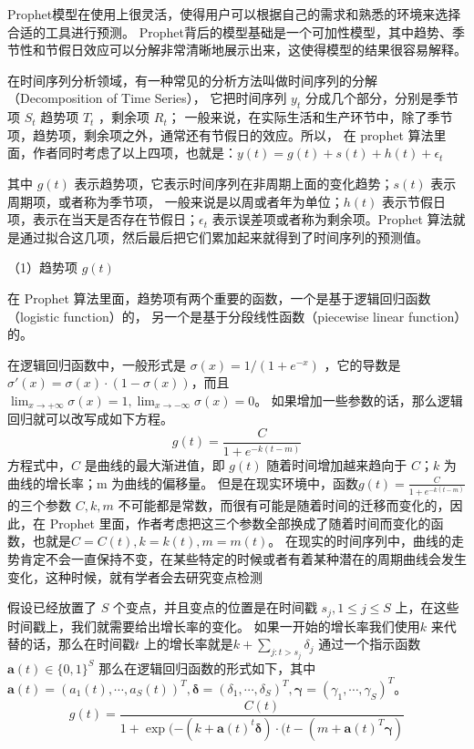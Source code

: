 Prophet模型在使用上很灵活，使得用户可以根据自己的需求和熟悉的环境来选择合适的工具进行预测。
Prophet背后的模型基础是一个可加性模型，其中趋势、季节性和节假日效应可以分解非常清晰地展示出来，这使得模型的结果很容易解释。

在时间序列分析领域，有一种常见的分析方法叫做时间序列的分解（Decomposition of Time Series），
它把时间序列 $y_t$ 分成几个部分，分别是季节项 $S_t$ 趋势项 $T_{t}$ ，剩余项 $R_{t}$；
一般来说，在实际生活和生产环节中，除了季节项，趋势项，剩余项之外，通常还有节假日的效应。所以，
在 prophet 算法里面，作者同时考虑了以上四项，也就是：$y(t) = g(t) + s(t) + h(t) + \epsilon_{t}$ 

其中 $g(t)$ 表示趋势项，它表示时间序列在非周期上面的变化趋势；$s(t)$ 表示周期项，或者称为季节项，
一般来说是以周或者年为单位；$h(t)$ 表示节假日项，表示在当天是否存在节假日；$\epsilon_{t}$ 表示误差项或者称为剩余项。Prophet 算法就是通过拟合这几项，然后最后把它们累加起来就得到了时间序列的预测值。

（1）趋势项 $g(t)$

在 Prophet 算法里面，趋势项有两个重要的函数，一个是基于逻辑回归函数（logistic function）的，
另一个是基于分段线性函数（piecewise linear function）的。

在逻辑回归函数中，一般形式是 $\sigma(x) = 1/(1+e^{-x})$ ，它的导数是 $\sigma'(x) = \sigma(x) \cdot(1-\sigma(x))$，而且$\lim_{x\rightarrow +\infty} \sigma(x) = 1, \lim_{x\rightarrow -\infty} \sigma(x) = 0$。
如果增加一些参数的话，那么逻辑回归就可以改写成如下方程\cite{李威2021Prophet模型在GNSS坐标时间序列中的插值分析}。
\begin{equation}
  g(t) = \frac{C}{1 + e^{-k(t - m)}}
\end{equation}
方程式中，$C$ 是曲线的最大渐进值，即 $g(t)$ 随着时间增加越来趋向于 $C$；$k$ 为曲线的增长率；m 为曲线的偏移量。
但是在现实环境中，函数$g(t) = \frac{C}{1 + e^{-k(t - m)}}$的三个参数 $C, k, m$ 不可能都是常数，而很有可能是随着时间的迁移而变化的，因此，在 Prophet 里面，作者考虑把这三个参数全部换成了随着时间而变化的函数，也就是$C = C(t), k = k(t), m = m(t)$。
在现实的时间序列中，曲线的走势肯定不会一直保持不变，在某些特定的时候或者有着某种潜在的周期曲线会发生变化，这种时候，就有学者会去研究变点检测

假设已经放置了 $S$ 个变点，并且变点的位置是在时间戳 $s_{j}, 1\leq j\leq S$ 上，在这些时间戳上，我们就需要给出增长率的变化。
如果一开始的增长率我们使用$k$ 来代替的话，那么在时间戳$t$ 上的增长率就是$k + \sum_{j:t>s_{j}} \delta_{j}$ 通过一个指示函数 $\mathbf{a}(t)\in \{0,1\}^{S}$
那么在逻辑回归函数的形式如下，其中 $\mathbf{a}(t) = (a_{1}(t),\cdots,a_{S}(t))^{T},  \mathbf{\delta} = (\delta_{1},\cdots,\delta_{S})^{T}, \mathbf{\gamma} = (\gamma_{1},\cdots,\gamma_{S})^{T}$。
\begin{equation}
  g(t) = \frac{C(t)}{1+\exp(-(k+\mathbf{a}(t)^{t}\mathbf{\delta}) \cdot (t - (m+\mathbf{a}(t)^{T}\mathbf{\gamma})}
\end{equation}

